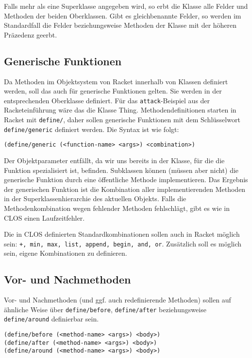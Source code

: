 Falls mehr als eine Superklasse angegeben wird, so erbt die Klasse alle Felder und Methoden der beiden Oberklassen. Gibt es gleichbenannte Felder, so werden im Standardfall die Felder beziehungsweise Methoden der Klasse mit der höheren Präzedenz geerbt.

\subsection{Generische Funktionen}
Da Methoden im Objektsystem von Racket innerhalb von Klassen definiert werden, soll das auch für generische Funktionen gelten. Sie werden in der entsprechenden Oberklasse definiert. Für das \texttt{attack}-Beispiel aus der Racketeinführung wäre das die Klasse Thing. Methodendefinitionen starten in Racket mit \texttt{define/}, daher sollen generische Funktionen mit dem Schlüsselwort \texttt{define/generic} definiert werden. Die Syntax ist wie folgt:

\texttt{(define/generic ({\textless}function-name{\textgreater} {\textless}args{\textgreater}) {\textless}combination{\textgreater})}

Der Objektparameter entfällt, da wir uns bereits in der Klasse, für die die Funktion spezialisiert ist, befinden. Subklassen können (müssen aber nicht) die generische Funktion durch eine öffentliche Methode implementieren. Das Ergebnis der generischen Funktion ist die Kombination aller implementierenden Methoden in der Superklassenhierarchie des aktuellen Objekts. Falls die Methodenkombination wegen fehlender Methoden fehlschlägt, gibt es wie in CLOS einen Laufzeitfehler.

Die in CLOS definierten Standardkombinationen sollen auch in Racket möglich sein: \texttt{+, min, max, list, append, begin, and, or}. 
Zusätzlich soll es möglich sein, eigene Kombinationen zu definieren.


\subsection{Vor- und Nachmethoden}
Vor- und Nachmethoden (und ggf. auch redefinierende Methoden) sollen auf ähnliche Weise über \texttt{define/before}, \texttt{define/after} beziehungsweise \texttt{define/around} definierbar sein. 

\texttt{(define/before ({\textless}method-name{\textgreater} {\textless}args{\textgreater}) {\textless}body{\textgreater})}\\
\texttt{(define/after ({\textless}method-name{\textgreater} {\textless}args{\textgreater}) {\textless}body{\textgreater})}\\
\texttt{(define/around ({\textless}method-name{\textgreater} {\textless}args{\textgreater}) {\textless}body{\textgreater})}

